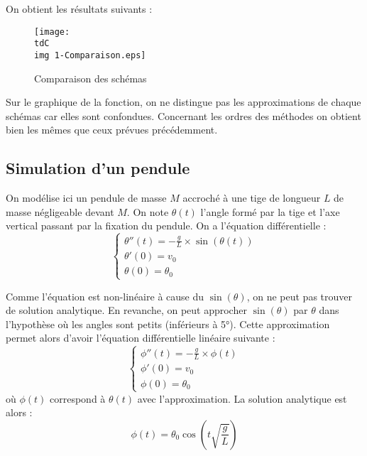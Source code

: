 		On obtient les résultats suivants :
		\begin{figure}[H]
			\centering
			\texttt{[image: \\tdC\\img 1-Comparaison.eps]}
			\caption{Comparaison des schémas}
			\label{img-3-comparaison}
		\end{figure}

		Sur le graphique de la fonction, on ne distingue pas les approximations de chaque schémas car elles sont confondues. Concernant les ordres des méthodes on obtient bien les mêmes que ceux prévues précédemment.


	\subsection{Simulation d'un pendule}

		On modélise ici un pendule de masse $M$ accroché à une tige de longueur $L$ de masse négligeable devant $M$. On note $\theta(t)$ l'angle formé par la tige et l'axe vertical passant par la fixation du pendule.
		On a l'équation différentielle :
		\begin{equation}
			\label{eq-3-pendule}
			\begin{cases}
				\theta''(t) = -\frac{g}{L} \times\sin(\theta(t))		\\
				\theta'(0) = v_0		\\
				\theta(0) = \theta_0
			\end{cases}
		\end{equation}

		Comme l'équation est non-linéaire à cause du $\sin(\theta)$, on ne peut pas trouver de solution analytique. En revanche, on peut approcher $\sin(\theta)$ par $\theta$ dans l'hypothèse où les angles sont petits (inférieurs à 5°). Cette approximation permet alors d'avoir l'équation différentielle linéaire suivante :
		\begin{equation}
			\label{eq-3-penduleApprox}
			\begin{cases}
				\phi''(t) = -\frac{g}{L} \times\phi(t)		\\
				\phi'(0) = v_0		\\
				\phi(0) = \theta_0
			\end{cases}
		\end{equation}
		où $\phi(t)$ correspond à $\theta(t)$ avec l'approximation.
		La solution analytique est alors :
		\begin{equation}
			\label{eq-3-soluceApprox}
			\phi(t) = \theta_0 \cos \left( t\sqrt{\frac{g}{L}} \right)
		\end{equation}

